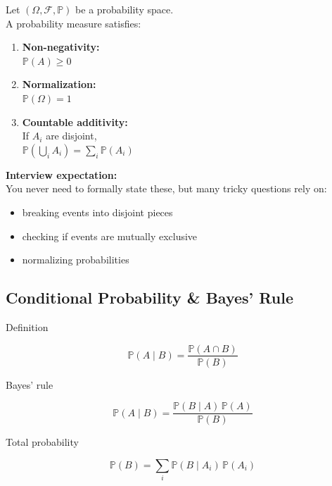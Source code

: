 \documentclass{report}
\begin{document}
Let $(\Omega, \mathcal{F}, \mathbb{P})$ be a probability space. \\
A probability measure satisfies:

\begin{enumerate}
    \item \textbf{Non-negativity:} \\
    $\mathbb{P}(A) \geq 0$
    
    \item \textbf{Normalization:} \\
    $\mathbb{P}(\Omega) = 1$
    
    \item \textbf{Countable additivity:} \\
    If $A_i$ are disjoint, \\
    $\mathbb{P}\left(\bigcup_{i} A_i\right) = \sum_{i} \mathbb{P}(A_i)$
\end{enumerate}

\textbf{Interview expectation:} \\
You never need to formally state these, but many tricky questions rely on:
\begin{itemize}
    \item breaking events into disjoint pieces
    \item checking if events are mutually exclusive
    \item normalizing probabilities
\end{itemize}

\subsection*{Conditional Probability \& Bayes' Rule}

Definition

\begin{equation}
    \mathbb{P}(A \mid B) = \frac{\mathbb{P}(A \cap B)}{\mathbb{P}(B)}
\end{equation}

Bayes' rule

\begin{equation}
    \mathbb{P}(A \mid B) = \frac{\mathbb{P}(B \mid A)\,\mathbb{P}(A)}{\mathbb{P}(B)}
\end{equation}

Total probability

\begin{equation}
    \mathbb{P}(B) = \sum_i \mathbb{P}(B \mid A_i)\,\mathbb{P}(A_i)
\end{equation}
\end{document}
